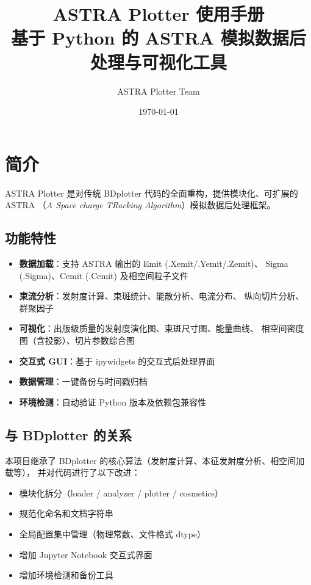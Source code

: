 \documentclass[11pt,a4paper]{article}
\title{\textbf{ASTRA Plotter 使用手册}\\[0.5em]
       \large 基于 Python 的 ASTRA 模拟数据后处理与可视化工具}
\author{ASTRA Plotter Team}
\date{\today}
\begin{document}
\maketitle
\tableofcontents
\newpage

\section{简介}

ASTRA Plotter 是对传统 BDplotter 代码的全面重构，提供模块化、可扩展的 ASTRA
（\textit{A Space charge TRacking Algorithm}）模拟数据后处理框架。

\subsection{功能特性}
\begin{itemize}
    \item \textbf{数据加载}：支持 ASTRA 输出的 Emit (.Xemit/.Yemit/.Zemit)、
          Sigma (.Sigma)、Cemit (.Cemit) 及相空间粒子文件
    \item \textbf{束流分析}：发射度计算、束斑统计、能散分析、电流分布、
          纵向切片分析、群聚因子
    \item \textbf{可视化}：出版级质量的发射度演化图、束斑尺寸图、能量曲线、
          相空间密度图（含投影）、切片参数综合图
    \item \textbf{交互式 GUI}：基于 ipywidgets 的交互式后处理界面
    \item \textbf{数据管理}：一键备份与时间戳归档
    \item \textbf{环境检测}：自动验证 Python 版本及依赖包兼容性
\end{itemize}

\subsection{与 BDplotter 的关系}
本项目继承了 BDplotter 的核心算法（发射度计算、本征发射度分析、相空间加载等），
并对代码进行了以下改进：
\begin{itemize}
    \item 模块化拆分（loader / analyzer / plotter / cosmetics）
    \item 规范化命名和文档字符串
    \item 全局配置集中管理（物理常数、文件格式 dtype）
    \item 增加 Jupyter Notebook 交互式界面
    \item 增加环境检测和备份工具
\end{itemize}
\end{document}
